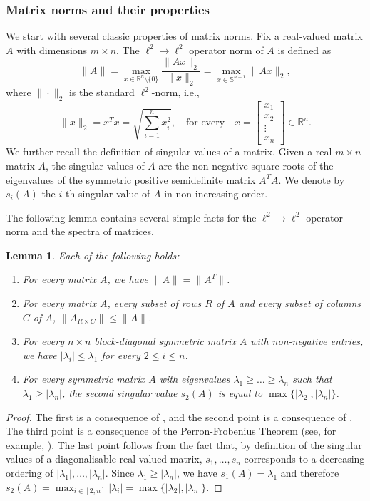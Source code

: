 \documentclass[reqno,a4paper]{amsart}
\newtheorem{lemma}[theorem]{Lemma}
\theoremstyle{definition}
\begin{document}
\subsubsection{Matrix norms and their properties} We start with several classic properties of matrix norms.
Fix a real-valued matrix $A$ with dimensions $m\times n$.
The $\ell^2\to \ell^2$ operator norm of $A$ is defined as 
\[\|A\| = \max_{x \in \mathbb R^n\setminus \{0\}} \frac{\|Ax\|_2}{\|x\|_2} = \max_{x\in \mathbb S^{n-1}} \|Ax\|_2,\]
where $\|\cdot\|_2$ is the standard $\ell^2$-norm, i.e.,
\[
    \|x\|_2=x^T x=\sqrt{\sum_{i=1}^n x_i^2}, \quad \text{for every} \quad x = \begin{bmatrix}
    x_1 \\
    x_2 \\
    \vdots \\
    x_n
    \end{bmatrix}\in \mathbb{R}^n.
\]
We further recall the definition of singular values of a matrix. Given a real $m\times n$ matrix $A$, the singular values of $A$ are the
non-negative square roots of the eigenvalues of the symmetric positive semidefinite matrix $A^T A$. We denote by $s_i(A)$ the $i$-th singular value of $A$ in non-increasing order.

The following lemma contains several simple facts for the $\ell^2\to\ell^2$ operator norm and the spectra of matrices.

\begin{lemma}\label{lem:operator}
Each of the following holds:
\begin{enumerate}
    \item[\emph{(i)}] For every matrix $A$, we have $\|A\|=\|A^T\|$.
    \item[\emph{(ii)}] For every matrix $A$, every subset of rows $R$ of $A$ and every subset of columns $C$ of $A$, $\|A_{R\times C}\|\le \|A\|$. 
    \item [\emph{(iii)}] For every $n\times n$ block-diagonal symmetric matrix $A$ with non-negative entries, we have $|\lambda_i|\le \lambda_1$ for every $2\le i\le n$.
    \item[\emph{(iv)}] For every symmetric matrix $A$ with eigenvalues $\lambda_1\ge \ldots\ge \lambda_n$ such that $\lambda_1 \ge |\lambda_n|$, the second singular value $s_2(A)$ is equal to $\max\{|\lambda_2|,|\lambda_n|\}$.
\end{enumerate}
\end{lemma}
\begin{proof}
The first is a consequence of \cite[Chapter 17, page 17-3, fact 9(a)]{Hog06}, and the second point is a consequence of \cite[Chapter 17, page 17-7, fact 3]{Hog06}. The third point is a consequence of the Perron-Frobenius Theorem (see, for example, \cite[Chapter 9, page 9-4, fact 5]{Hog06}).
The last point follows from the fact that, by definition of the singular values of a diagonalisable real-valued matrix, $s_1,\ldots,s_n$ corresponds to a decreasing ordering of $|\lambda_1|,\ldots,|\lambda_n|$.
Since $\lambda_1\ge |\lambda_n|$, we have $s_1(A)=\lambda_1$ and therefore $s_2(A)=\max_{i\in [2,n]} |\lambda_i| = \max\{|\lambda_2|,|\lambda_n|\}$.
\end{proof}
\end{document}
